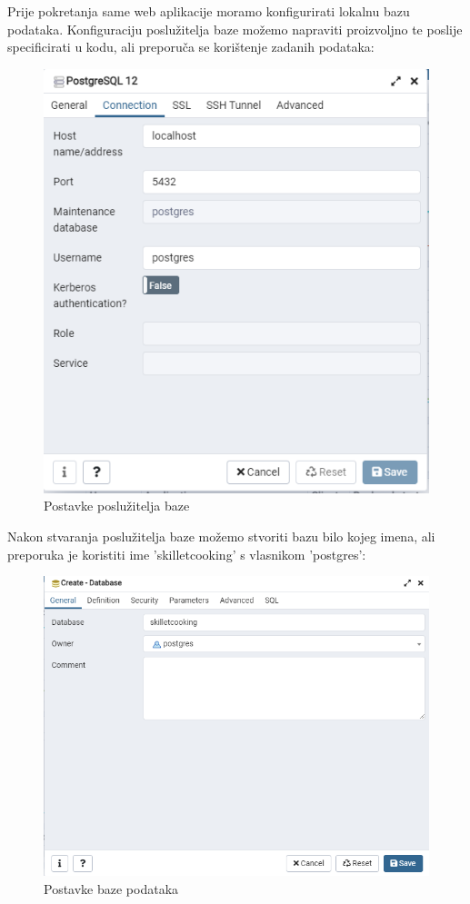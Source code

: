 Prije pokretanja same web aplikacije moramo konfigurirati lokalnu bazu podataka. Konfiguraciju poslužitelja baze možemo napraviti proizvoljno te poslije specificirati u kodu, ali preporuča se korištenje zadanih podataka:
\begin{figure}[H]
	\includegraphics[scale=1]{slike/server_properties.PNG} %
	\centering
	\caption{Postavke poslužitelja baze}
	\label{fig:promjene}
\end{figure}
Nakon stvaranja poslužitelja baze možemo stvoriti bazu bilo kojeg imena, ali preporuka je koristiti ime 'skilletcooking' s vlasnikom 'postgres':
\begin{figure}[H]
	\includegraphics[scale=0.8]{slike/database_properties.PNG} %
	\centering
	\caption{Postavke baze podataka}
	\label{fig:promjene}
\end{figure}

